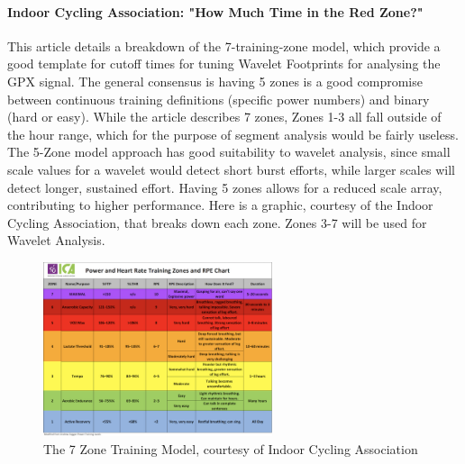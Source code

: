 \documentclass[11pt,a4paper]{report}
\begin{document}
\paragraph{Indoor Cycling Association: "How Much Time in the Red Zone?"}
This article details a breakdown of the 7-training-zone model, which provide a good template for cutoff times for tuning Wavelet Footprints for analysing the GPX signal.
The general consensus is having 5 zones is a good compromise between continuous training definitions (specific power numbers) and binary (hard or easy). While the article describes 7 zones,
Zones 1-3 all fall outside of the hour range, which for the purpose of segment analysis would be fairly useless. The 5-Zone model approach
has good suitability to wavelet analysis, since small scale values for a wavelet would detect short burst efforts, while larger scales will detect longer, sustained effort.
Having 5 zones allows for a reduced scale array, contributing to higher performance. Here is a graphic, courtesy of the Indoor Cycling Association, that breaks down each zone. Zones 3-7 will be used for Wavelet Analysis.
\begin{figure}[h!]
	\begin{center}
		\includegraphics[width=0.6\textwidth]{zones.png}
	\end{center}
	\caption{The 7 Zone Training Model, courtesy of Indoor Cycling Association}
\end{figure}
\end{document}

